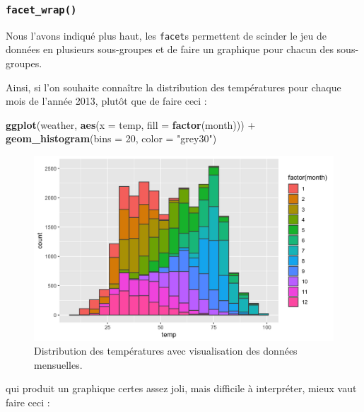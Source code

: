 \documentclass[a4paperpaper,]{article}
\newenvironment{Shaded}{\begin{snugshade}}{\end{snugshade}}
\newcommand{\DataTypeTok}[1]{\textcolor[rgb]{0.00,0.34,0.68}{#1}}
\newcommand{\DecValTok}[1]{\textcolor[rgb]{0.69,0.50,0.00}{#1}}
\newcommand{\KeywordTok}[1]{\textcolor[rgb]{0.12,0.11,0.11}{\textbf{#1}}}
\newcommand{\NormalTok}[1]{\textcolor[rgb]{0.12,0.11,0.11}{#1}}
\newcommand{\OperatorTok}[1]{\textcolor[rgb]{0.12,0.11,0.11}{#1}}
\newcommand{\StringTok}[1]{\textcolor[rgb]{0.75,0.01,0.01}{#1}}
\begin{document}
\hypertarget{facet_wrap}{%
\subsubsection{\texorpdfstring{\texttt{facet\_wrap()}}{facet\_wrap()}}\label{facet_wrap}}

Nous l'avons indiqué plus haut, les \texttt{facet}s permettent de scinder le jeu de données en plusieurs sous-groupes et de faire un graphique pour chacun des sous-groupes.

Ainsi, si l'on souhaite connaître la distribution des températures pour chaque mois de l'année 2013, plutôt que de faire ceci :

\begin{Shaded}
\begin{Highlighting}[]
\KeywordTok{ggplot}\NormalTok{(weather, }\KeywordTok{aes}\NormalTok{(}\DataTypeTok{x =}\NormalTok{ temp, }\DataTypeTok{fill =} \KeywordTok{factor}\NormalTok{(month))) }\OperatorTok{+}
\StringTok{  }\KeywordTok{geom_histogram}\NormalTok{(}\DataTypeTok{bins =} \DecValTok{20}\NormalTok{, }\DataTypeTok{color =} \StringTok{"grey30"}\NormalTok{)}
\end{Highlighting}
\end{Shaded}

\begin{figure}[htpb]

{\centering \includegraphics[width=0.9\linewidth]{figure/unnamed-chunk-52-1} 

}

\caption{Distribution des températures avec visualisation des données mensuelles.}\label{fig:unnamed-chunk-52}
\end{figure}

qui produit un graphique certes assez joli, mais difficile à interpréter, mieux vaut faire ceci :
\end{document}
